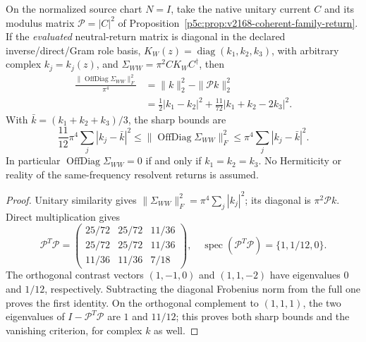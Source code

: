 \documentclass[12pt,a4paper]{article}
\begin{document}
\begin{theorem}
\label{p5c:thm:v348-weak-memory-coherence-norm}
On the normalized source chart $N=I$, take the native unitary
current $C$ and its modulus matrix $\mathcal P=|C|^2$ of
Proposition~\ref{p5c:prop:v2168-coherent-family-return}.  If the
\emph{evaluated} neutral-return matrix is diagonal in the declared
inverse/direct/Gram role basis,
$K_W(z)=\operatorname{diag}(k_1,k_2,k_3)$, with arbitrary complex
$k_j=k_j(z)$, and $\Sigma_{WW}=\pi^2 CK_WC^\dagger$, then
\[
 \boxed{\begin{aligned}
 \frac{\|\operatorname{OffDiag}\Sigma_{WW}\|_F^2}{\pi^4}
 &=\|k\|_2^2-\|\mathcal P k\|_2^2\\
 &=\frac12|k_1-k_2|^2
   +\frac{11}{72}|k_1+k_2-2k_3|^2.
 \end{aligned}}
\]
With $\bar k=(k_1+k_2+k_3)/3$, the sharp bounds are
\[
 \boxed{\frac{11}{12}\pi^4\sum_j|k_j-\bar k|^2
 \le \|\operatorname{OffDiag}\Sigma_{WW}\|_F^2
 \le \pi^4\sum_j|k_j-\bar k|^2.}
\]
In particular $\operatorname{OffDiag}\Sigma_{WW}=0$
if and only if $k_1=k_2=k_3$.  No Hermiticity or reality of the
same-frequency resolvent returns is assumed.
\end{theorem}
\begin{proof}
Unitary similarity gives
$\|\Sigma_{WW}\|_F^2=\pi^4\sum_j|k_j|^2$;
its diagonal is $\pi^2\mathcal Pk$.  Direct multiplication gives
\[
 \mathcal P^T\mathcal P=
 \begin{pmatrix}
 25/72&25/72&11/36\\
 25/72&25/72&11/36\\
 11/36&11/36&7/18
 \end{pmatrix},\quad
 \operatorname{spec}(\mathcal P^T\mathcal P)=\{1,1/12,0\}.
\]
The orthogonal contrast vectors $(1,-1,0)$ and $(1,1,-2)$
have eigenvalues $0$ and $1/12$, respectively.  Subtracting
the diagonal Frobenius norm from the full one proves the first
identity.  On the orthogonal complement to $(1,1,1)$, the two
eigenvalues of $I-\mathcal P^T\mathcal P$ are $1$ and $11/12$;
this proves both sharp bounds and the vanishing criterion, for
complex $k$ as well.
\end{proof}
\end{document}
